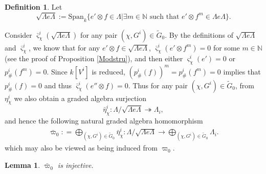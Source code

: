 \documentclass[11pt,reqno]{amsart}
\newtheorem{lemma}[theorem]{Lemma}
\theoremstyle{definition}
\newtheorem{definition}[theorem]{Definition}
\begin{document}
\begin{definition}\label{bdfbv11267}
Let
$$
\sqrt{\Lambda e\Lambda} := \mathrm{Span}_{k}\Big\{e' \otimes f 
\in \Lambda \big\vert \exists m \in \mathbb{N}
\mbox{ such that }
e' \otimes f^m \in \Lambda e\Lambda \Big\}. 
$$
\end{definition}




Consider $\bar{\varsigma}_{\chi}^{i} ( \sqrt{\Lambda e\Lambda} )$ 
for any pair $(\chi, G^i) \in \tilde{G}_0$. 
By the definitions of $\sqrt{\Lambda e\Lambda}$ and $\bar{\varsigma}_{\chi}^{i}$, we know that 
for any $e' \otimes f \in \sqrt{\Lambda e\Lambda}$, 
$\bar{\varsigma}_{\chi}^{i}(e' \otimes f^m ) = 0$ for some $m \in \mathbb{N}$ 
(see the proof of Proposition \ref{Modstru}),
and
then either $\varsigma_{\chi}^{i}(e') = 0$ or 
$ p_{\#}^{i}(f^{m}) = 0$. Since $k[V^i]$ is reduced, 
$(p_{\#}^{i}(f))^m = p_{\#}^{i}(f^{m}) = 0$ implies that $ p_{\#}^{i}(f) = 0$ and thus 
$\bar{\varsigma}_{\chi}^{i}(e'' \otimes f ) = 0$. 
Thus for any pair $(\chi, G^i) \in \tilde{G}_0$, 
from $\eta_{\chi}^{i}$
we also obtain a graded algebra surjection  
$$
\bar{\eta}_{\chi}^{i}: \Lambda / \sqrt{\Lambda e\Lambda} \twoheadrightarrow \Lambda_i,
$$
and hence the following natural graded algebra homomorphism 
\begin{align}\label{jxkdbn}
\bar{\varpi}_0 : =  \bigoplus_{(\chi, G^i) \in \tilde{G}_0} \bar{\eta}^{i}_{\chi}: 
\Lambda / \sqrt{\Lambda e \Lambda} \rightarrow \bigoplus_{(\chi, G^i) \in \tilde{G}_0} \Lambda_i.
\end{align}
which may also be viewed as
being induced from $\varpi_0$.


\begin{lemma}\label{NNned1}
$\bar{\varpi}_0$ is injective. 
\end{lemma}
\end{document}

